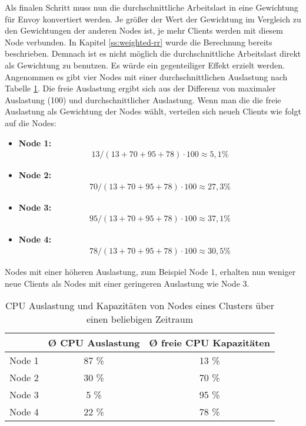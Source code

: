 Als finalen Schritt muss nun die durchschnittliche Arbeitslast in eine Gewichtung für Envoy konvertiert werden. Je grö{\ss}er der Wert der Gewichtung im Vergleich zu den Gewichtungen der anderen Nodes ist, je mehr Clients werden mit diesem Node verbunden. In Kapitel \ref{ss:weighted-rr} wurde die Berechnung bereits beschrieben. Demnach ist es nicht möglich die durchschnittliche Arbeitslast direkt als Gewichtung zu benutzen. Es würde ein gegenteiliger Effekt erzielt werden.
Angenommen es gibt vier Nodes mit einer durchschnittlichen Auslastung nach Tabelle \ref{table:example-cluster-cpu}. Die freie Auslastung ergibt sich aus der Differenz von maximaler Auslastung (100) und durchschnittlicher Auslastung. Wenn man die die freie Auslastung als Gewichtung der Nodes wählt, verteilen sich neueh Clients wie folgt auf die Nodes:
\begin{itemize}
  \item \textbf{Node 1:}
    \begin{align}
      13 / (13 + 70 + 95 + 78) \cdot 100 \approx 5,1 \%
    \end{align}
  \item \textbf{Node 2:}
    \begin{align}
      70 / (13 + 70 + 95 + 78) \cdot 100 \approx 27,3 \%
    \end{align}
  \item \textbf{Node 3:}
    \begin{align}
      95 / (13 + 70 + 95 + 78) \cdot 100 \approx 37,1 \%
    \end{align}
  \item \textbf{Node 4:}
    \begin{align}
      78 / (13 + 70 + 95 + 78) \cdot 100 \approx 30,5 \%
    \end{align}
\end{itemize}
Nodes mit einer höheren Auslastung, zum Beispiel Node 1, erhalten nun weniger neue Clients als Nodes mit einer geringeren Auslastung wie Node 3.

\begin{table}[h!]
\centering
\renewcommand{\arraystretch}{1.5}
\begin{tabular}{|l|c|c|}
    \hline
    & \textbf{Ø CPU Auslastung} & \textbf{Ø freie CPU Kapazitäten} \\
    \hline
    \hline
    Node 1 & 87 \% & 13 \% \\
    \hline
    Node 2 & 30 \% & 70 \% \\
    \hline
    Node 3 & 5 \% & 95 \% \\
    \hline
    Node 4 & 22 \% & 78 \% \\
    \hline
\end{tabular}
\caption{CPU Auslastung und Kapazitäten von Nodes eines Clusters über einen beliebigen Zeitraum}
\label{table:example-cluster-cpu}
\end{table}

